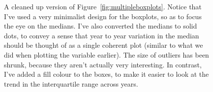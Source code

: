 \begin{figure}[t]
\begin{center}
\caption{A cleaned up version of Figure~\ref{fig:multipleboxplots}. Notice that I've used a very minimalist design for the boxplots, so as to focus the eye on the medians. I've also converted the medians to solid dots, to convey a sense that year to year variation in the median should be thought of as a single coherent plot (similar to what we did when plotting the  variable earlier). The size of outliers has been shrunk, because they aren't actually very interesting. In contrast, I've added a fill colour to the boxes, to make it easier to look at the trend in the interquartile range across years. }
\HR
\label{fig:multipleboxplots2}
\end{center}
\end{figure}


